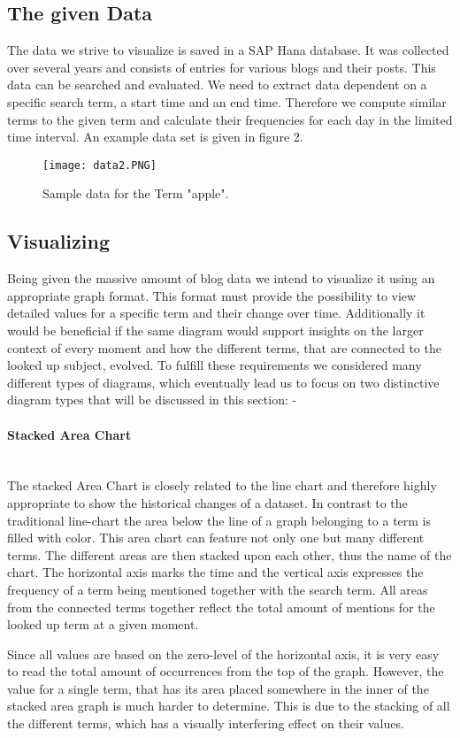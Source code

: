\documentclass{llncs}
\newcommand{\myparagraph}[1]{\paragraph{#1}\mbox{}\\}
\begin{document}
\subsection{The given Data}

The data we strive to visualize is saved in a SAP Hana database. It was collected over several years and consists of entries for various blogs and their posts. This data can be searched and evaluated. We need to extract data dependent on a specific search term, a start time and an end time. Therefore we compute similar terms to the given term and calculate their frequencies for each day in the limited time interval. An example data set is given in figure 2. 
\begin{figure}[h!]
\caption{\label{fig:data}Sample data for the Term "apple".}
  \centering
  \texttt{[image: data2.PNG]}
\end{figure}

\subsection{Visualizing}
Being given the massive amount of blog data we intend to visualize it using an appropriate graph format. This format must provide the possibility to view detailed values for a specific term and their change over time. Additionally it would be beneficial if the same diagram would support insights on the larger context of every moment and how the different terms, that are connected to the looked up subject, evolved. To fulfill these requirements we considered many different types of diagrams, which eventually lead us to focus on two distinctive diagram types that will be discussed in this section:
- 

\myparagraph{Stacked Area Chart}
The stacked Area Chart is closely related to the line chart and therefore highly appropriate to show the historical changes of a dataset. In contrast to the traditional line-chart the area below the line of a graph belonging to a term is filled with color. This area chart can feature not only one but many different terms. The different areas are then stacked upon each other, thus the name of the chart. The horizontal axis marks the time and the vertical axis expresses the frequency of a term being mentioned together with the search term. All areas from the connected terms together reflect the total amount of mentions for the looked up term at a given moment. 

Since all values are based on the zero-level of the horizontal axis, it is very easy to read the total amount of occurrences from the top of the graph. However, the value for a single term, that has its area placed somewhere in the inner of the stacked area graph is much harder to determine. This is due to the stacking of all the different terms, which has a visually interfering effect on their values. 
\end{document}
